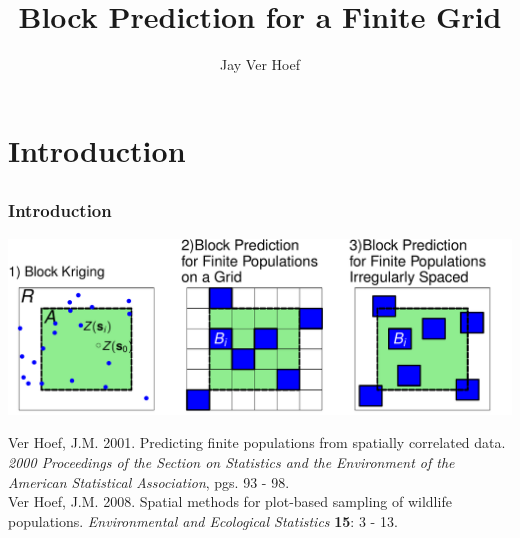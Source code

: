 \documentclass[mathserif,compress]{beamer}\usepackage{graphicx, color}
\makeatletter
\def\maxwidth{ %
  \ifdim\Gin@nat@width>\linewidth
    \linewidth
  \else
    \Gin@nat@width
  \fi
}
\makeatother
\begin{document}
\title[]{Block Prediction for a Finite Grid}

\author[Jay M. Ver Hoef]{Jay Ver Hoef} 

\date[05/17/13]{}
 
\maketitle
 
   

\section{Introduction}
\subsection{}
\begin{frame}[fragile]
\frametitle{Introduction}
	
	\includegraphics[width=\maxwidth]{figure/Introductory-plot}

\vspace{.5cm}
\scriptsize
Ver Hoef, J.M.  2001.  Predicting finite populations from spatially correlated data. {\it 2000 Proceedings of the Section on Statistics and the Environment of the American Statistical Association}, pgs. 93 - 98. \\

Ver Hoef, J.M.   2008.  Spatial methods for plot-based sampling of wildlife populations.  {\it Environmental and Ecological Statistics} {\bf 15}: 3 - 13.

\end{frame}
\end{document}
